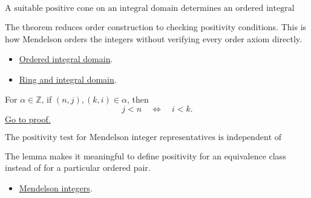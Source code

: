 \begin{remark*}
\[
  \text{A suitable positive cone on an integral domain determines an ordered
  integral domain.}
\]
\end{remark*}

\begin{remark*}[Interpretation]
The theorem reduces order construction to checking positivity conditions. This
is how Mendelson orders the integers without verifying every order axiom
directly.
\end{remark*}

\begin{dependencies}
\begin{itemize}
  \item \hyperref[def:men-ordered-integral-domain]{Ordered integral domain}.
  \item \hyperref[def:men-ring-integral-domain]{Ring and integral domain}.
\end{itemize}
\end{dependencies}

\begin{lemma}
\label{lem:men-positivity-class-invariant}
For \(\alpha\in\mathbb{Z}\), if \((n,j),(k,i)\in\alpha\), then
\[
  j<n \quad\Longleftrightarrow\quad i<k.
\]
\hyperref[prf:men-positivity-class-invariant]{Go to proof.}
\end{lemma}

\begin{remark*}
\[
  \text{The positivity test for Mendelson integer representatives is
  independent of representative.}
\]
\end{remark*}

\begin{remark*}[Interpretation]
The lemma makes it meaningful to define positivity for an equivalence class
instead of for a particular ordered pair.
\end{remark*}

\begin{dependencies}
\begin{itemize}
  \item \hyperref[def:men-integers]{Mendelson integers}.
\end{itemize}
\end{dependencies}

